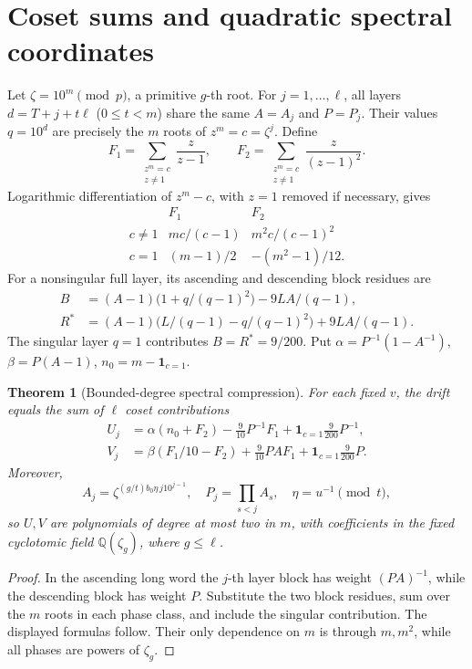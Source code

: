 \documentclass[10pt]{article}
\newtheorem{theorem}{Theorem}
\begin{document}
\section{Coset sums and quadratic spectral coordinates}
Let \(\zeta=10^m\pmod p\), a primitive \(g\)-th root.
For \(j=1,\ldots,\ell\), all layers
\(d=T+j+t\ell\) (\(0\le t<m\)) share the same
\(A=A_j\) and \(P=P_j\). Their values \(q=10^d\)
are precisely the \(m\) roots of \(z^m=c=\zeta^j\).
Define
\[
F_1=\sum_{\substack{z^m=c\\z\ne1}}\frac z{z-1},
\qquad
F_2=\sum_{\substack{z^m=c\\z\ne1}}\frac z{(z-1)^2}.
\]
Logarithmic differentiation of \(z^m-c\), with \(z=1\)
removed if necessary, gives
\[
\begin{array}{c|cc}
 &F_1&F_2\\\hline
c\ne1&mc/(c-1)&m^2c/(c-1)^2\\
c=1&(m-1)/2&-(m^2-1)/12 .
\end{array}
\]
For a nonsingular full layer, its ascending and descending
block residues are
\[
\begin{aligned}
B&=(A-1)\bigl(1+q/(q-1)^2\bigr)-9LA/(q-1),\\
R^*&=(A-1)\bigl(L/(q-1)-q/(q-1)^2\bigr)
 +9LA/(q-1).
\end{aligned}
\]
The singular layer \(q=1\) contributes
\(B=R^*=9/200\). Put
\(\alpha=P^{-1}(1-A^{-1})\),
\(\beta=P(A-1)\), \(n_0=m-\mathbf 1_{c=1}\).

\begin{theorem}[Bounded-degree spectral compression]
For each fixed \(v\), the drift equals the sum of \(\ell\)
coset contributions
\[
\begin{aligned}
U_j&=\alpha(n_0+F_2)-\tfrac9{10}P^{-1}F_1
       +\mathbf1_{c=1}\tfrac9{200}P^{-1},\\
V_j&=\beta(F_1/10-F_2)+\tfrac9{10}PAF_1
       +\mathbf1_{c=1}\tfrac9{200}P.
\end{aligned}
\tag{1}
\]
Moreover,
\[
A_j=\zeta^{(g/t)b_0\eta\,j10^{j-1}},
\quad
P_j=\prod_{s<j}A_s,\quad \eta=u^{-1}\pmod t,
\]
so \(U,V\) are polynomials of degree at most two in \(m\),
with coefficients in the fixed cyclotomic field
\(\mathbb Q(\zeta_g)\), where \(g\le\ell\).
\end{theorem}
\begin{proof}
In the ascending long word the \(j\)-th layer block has weight
\((PA)^{-1}\), while the descending block has weight \(P\).
Substitute the two block residues, sum over the \(m\) roots in
each phase class, and include the singular contribution.
The displayed formulas follow. Their only dependence on \(m\)
is through \(m,m^2\), while all phases are powers of \(\zeta_g\).
\end{proof}
\end{document}
